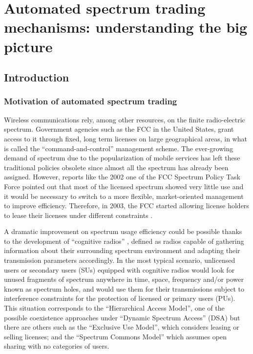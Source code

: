 \graphicspath{ {img/Survey/} }
\chapter[Automated spectrum trading mechanisms: understanding the big picture][Automated spectrum trading mechanisms]{Automated spectrum trading mechanisms: understanding the big picture}\label{Survey_chap}
\section{Introduction}\label{Survey_sec_Intro}

\subsection{Motivation of automated spectrum trading}
Wireless communications rely, among other resources, on the finite radio-electric spectrum. Government agencies such as the FCC in the United States, grant access to it through fixed, long term licenses on large geographical areas, in what is called the ``command-and-control'' management scheme. The ever-growing demand of spectrum due to the popularization of mobile services has left these traditional policies obsolete since almost all the spectrum has already been assigned. However, reports like the 2002 one of the FCC Spectrum Policy Task Force \cite{ref:FCC2002} pointed out that most of the licensed spectrum showed very little use and it would be necessary to switch to a more flexible, market-oriented management \cite{ref:Valletti2001} to improve efficiency. Therefore, in 2003, the FCC started allowing license holders to lease their licenses under different constraints \cite{ref:Mayo2010}. 

A dramatic improvement on spectrum usage efficiency could be possible thanks to the development of ``cognitive radios'' \cite{ref:Mitola1999}, defined as radios capable of gathering information about their surrounding spectrum environment and adapting their transmission parameters accordingly. In the most typical scenario, unlicensed users or secondary users (SUs) equipped with cognitive radios would look for unused fragments of spectrum anywhere in time, space, frequency and/or power known as spectrum holes, and would use them for their transmissions subject to interference constraints for the protection of licensed or primary users (PUs). This situation corresponds to the ``Hierarchical Access Model'', one of the possible coexistence approaches under ``Dynamic Spectrum Access'' (DSA) but there are others \cite{ref:Zhao2007} such as the ``Exclusive Use Model'', which considers leasing or selling licenses; and the ``Spectrum Commons Model'' which assumes open sharing with no categories of users. 

